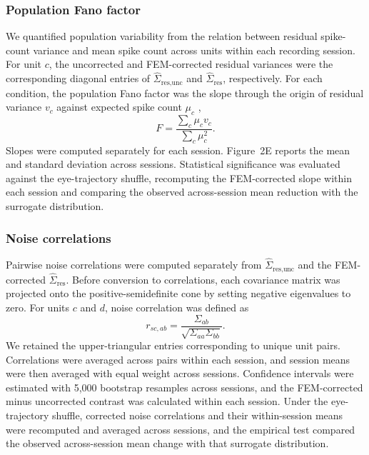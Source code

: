 \documentclass{lite}
\begin{document}
\subsubsection{Population Fano factor}
We quantified population variability from the relation between residual spike-count variance and mean spike count across units within each recording session. For unit $c$, the uncorrected and FEM-corrected residual variances were the corresponding diagonal entries of $\hat{\Sigma}_{\text{res}, \text{unc}}$ and $\hat{\Sigma}_{\mathrm{res}}$, respectively. For each condition, the population Fano factor was the slope through the origin of residual variance $v_c$ against expected spike count $\mu_c$ \cite{churchland2010stimulus},
\begin{equation}
F = \frac{\sum_c \mu_c v_c}{\sum_c \mu_c^2}.
\end{equation}
Slopes were computed separately for each session. Figure~2E reports the mean and standard deviation across sessions. Statistical significance was evaluated against the eye-trajectory shuffle, recomputing the FEM-corrected slope within each session and comparing the observed across-session mean reduction with the surrogate distribution.

\subsubsection{Noise correlations}
Pairwise noise correlations were computed separately from $\hat{\Sigma}_{\text{res}, \text{unc}}$ and the FEM-corrected $\hat{\Sigma}_{\mathrm{res}}$. Before conversion to correlations, each covariance matrix was projected onto the positive-semidefinite cone by setting negative eigenvalues to zero. For units $c$ and $d$, noise correlation was defined as
\begin{equation}
r_{sc,ab} = \frac{\Sigma_{ab}}{\sqrt{\Sigma_{aa}\Sigma_{bb}}}.
\end{equation}
We retained the upper-triangular entries corresponding to unique unit pairs. Correlations were averaged across pairs within each session, and session means were then averaged with equal weight across sessions. Confidence intervals were estimated with 5,000 bootstrap resamples across sessions, and the FEM-corrected minus uncorrected contrast was calculated within each session. Under the eye-trajectory shuffle, corrected noise correlations and their within-session means were recomputed and averaged across sessions, and the empirical test compared the observed across-session mean change with that surrogate distribution.
\end{document}
